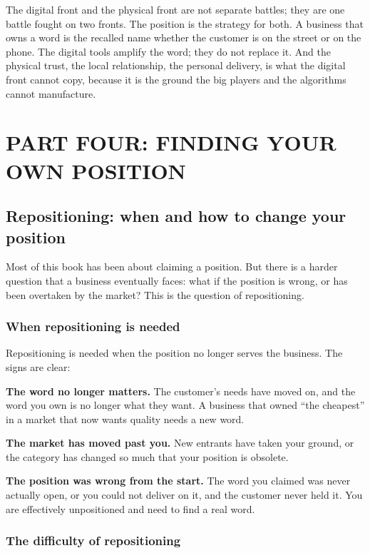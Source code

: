 \documentclass[10pt,twoside,openany]{memoir}
\newcommand{\needspacehead}{\needspace{4\baselineskip}}
\let\oldsection\section
\renewcommand{\section}{\needspacehead\oldsection}
\begin{document}
{The digital front and the physical front are not separate battles; they
are one battle fought on two fronts. The position is the strategy for
both. A business that owns a word is the recalled name whether the
customer is on the street or on the phone. The digital tools amplify the
word; they do not replace it. And the physical trust, the local
relationship, the personal delivery, is what the digital front cannot
copy, because it is the ground the big players and the algorithms cannot
manufacture.

\part{PART FOUR: FINDING YOUR OWN
POSITION}\label{part-four-finding-your-own-position}

\FloatBarrier
\chapter{Repositioning: when and how to change your
position}\label{repositioning-when-and-how-to-change-your-position}

Most of this book has been about claiming a position. But there is a
harder question that a business eventually faces: what if the position
is wrong, or has been overtaken by the market? This is the question of
repositioning.

\section{When repositioning is
needed}\label{when-repositioning-is-needed}

Repositioning is needed when the position no longer serves the business.
The signs are clear:

\textbf{The word no longer matters.} The customer's needs have moved on,
and the word you own is no longer what they want. A business that owned
``the cheapest'' in a market that now wants quality needs a new word.

\textbf{The market has moved past you.} New entrants have taken your
ground, or the category has changed so much that your position is
obsolete.

\textbf{The position was wrong from the start.} The word you claimed was
never actually open, or you could not deliver on it, and the customer
never held it. You are effectively unpositioned and need to find a real
word.

\section{The difficulty of
repositioning}\label{the-difficulty-of-repositioning}

}
\end{document}
